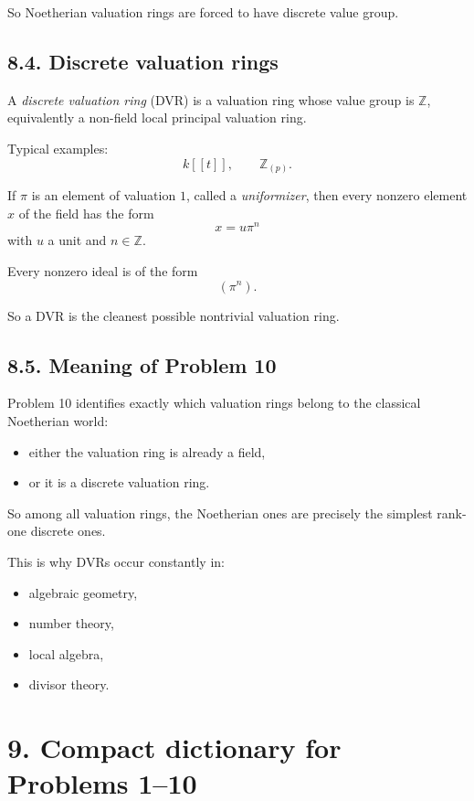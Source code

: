 \documentclass[12pt,a4paper]{article}
\theoremstyle{plain}
\theoremstyle{definition}      %
\begin{document}
So Noetherian valuation rings are forced to have discrete value group.

\subsection*{8.4. Discrete valuation rings}

A \emph{discrete valuation ring} (DVR) is a valuation ring whose value group is \(\mathbb{Z}\), equivalently a non-field local principal valuation ring.

Typical examples:
\[
k[[t]],\qquad \mathbb{Z}_{(p)}.
\]

If \(\pi\) is an element of valuation \(1\), called a \emph{uniformizer}, then every nonzero element \(x\) of the field has the form
\[
x=u\pi^n
\]
with \(u\) a unit and \(n\in \mathbb{Z}\).

Every nonzero ideal is of the form
\[
(\pi^n).
\]

So a DVR is the cleanest possible nontrivial valuation ring.

\subsection*{8.5. Meaning of Problem 10}

Problem 10 identifies exactly which valuation rings belong to the classical Noetherian world:
\begin{itemize}
	\item either the valuation ring is already a field,
	\item or it is a discrete valuation ring.
\end{itemize}

So among all valuation rings, the Noetherian ones are precisely the simplest rank-one discrete ones.

This is why DVRs occur constantly in:
\begin{itemize}
	\item algebraic geometry,
	\item number theory,
	\item local algebra,
	\item divisor theory.
\end{itemize}

\bigskip

\section*{9. Compact dictionary for Problems 1--10}
\end{document}
